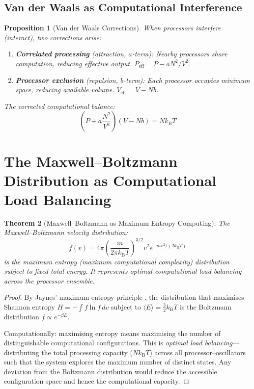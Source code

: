 \documentclass[twocolumn,10pt,a4paper]{article}
\theoremstyle{plain}
\newtheorem{theorem}{Theorem}[section]
\newtheorem{proposition}[theorem]{Proposition}
\theoremstyle{definition}
\theoremstyle{remark}
\newcommand{\kB}{k_{\mathrm{B}}}
\begin{document}
\subsection{Van der Waals as Computational Interference}

\begin{proposition}[Van der Waals Corrections]
\label{prop:vdw}
When processors interfere (interact), two corrections arise:
\begin{enumerate}
    \item \textbf{Correlated processing} (attraction, $a$-term): Nearby processors share computation, reducing effective output. $P_{\mathrm{eff}} = P - aN^2/V^2$.
    \item \textbf{Processor exclusion} (repulsion, $b$-term): Each processor occupies minimum space, reducing available volume. $V_{\mathrm{eff}} = V - Nb$.
\end{enumerate}
The corrected computational balance:
\begin{equation}
    \left(P + a\frac{N^2}{V^2}\right)(V - Nb) = N\kB T
\end{equation}
\end{proposition}

\section{The Maxwell--Boltzmann Distribution as Computational Load Balancing}
\label{sec:maxwell_computation}

\begin{theorem}[Maxwell--Boltzmann as Maximum Entropy Computing]
\label{thm:maxwell_compute}
The Maxwell--Boltzmann velocity distribution:
\begin{equation}
    f(v) = 4\pi\left(\frac{m}{2\pi\kB T}\right)^{3/2} v^2 e^{-mv^2/(2\kB T)}
\end{equation}
is the maximum entropy (maximum computational complexity) distribution subject to fixed total energy. It represents optimal computational load balancing across the processor ensemble.
\end{theorem}

\begin{proof}
By Jaynes' maximum entropy principle \cite{jaynes1957}, the distribution that maximises Shannon entropy $H = -\int f \ln f \, dv$ subject to $\langle E \rangle = \tfrac{3}{2}\kB T$ is the Boltzmann distribution $f \propto e^{-\beta E}$.

Computationally: maximising entropy means maximising the number of distinguishable computational configurations. This is \emph{optimal load balancing}---distributing the total processing capacity ($N\kB T$) across all processor--oscillators such that the system explores the maximum number of distinct states. Any deviation from the Boltzmann distribution would reduce the accessible configuration space and hence the computational capacity.
\end{proof}
\end{document}
